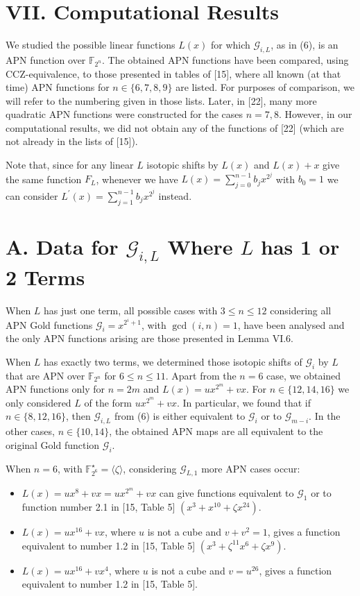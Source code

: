 \documentclass[10pt]{article}
\begin{document}
\section*{VII. Computational Results}
We studied the possible linear functions $L(x)$ for which $\mathcal{G}_{i, L}$, as in (6), is an APN function over $\mathbb{F}_{2^{n}}$. The obtained APN functions have been compared, using CCZ-equivalence, to those presented in tables of [15], where all known (at that time) APN functions for $n \in\{6,7,8,9\}$ are listed. For purposes of comparison, we will refer to the numbering given in those lists. Later, in [22], many more quadratic APN functions were constructed for the cases $n=7,8$. However, in our computational results, we did not obtain any of the functions of [22] (which are not already in the lists of [15]).

Note that, since for any linear $L$ isotopic shifts by $L(x)$ and $L(x)+x$ give the same function $F_{L}$, whenever we have $L(x)=\sum_{j=0}^{n-1} b_{j} x^{2^{j}}$ with $b_{0}=1$ we can consider $L^{\prime}(x)= \sum_{j=1}^{n-1} b_{j} x^{2^{j}}$ instead.

\section*{A. Data for $\mathcal{G}_{i, L}$ Where $L$ has 1 or 2 Terms}
When $L$ has just one term, all possible cases with $3 \leq n \leq 12$ considering all APN Gold functions $\mathcal{G}_{i}=x^{2^{i}+1}$, with $\operatorname{gcd}(i, n)=1$, have been analysed and the only APN functions arising are those presented in Lemma VI.6.

When $L$ has exactly two terms, we determined those isotopic shifts of $\mathcal{G}_{i}$ by $L$ that are APN over $\mathbb{F}_{2^{n}}$ for $6 \leq n \leq 11$. Apart from the $n=6$ case, we obtained APN functions only for $n=2 m$ and $L(x)=u x^{2^{m}}+v x$. For $n \in\{12,14,16\}$ we only considered $L$ of the form $u x^{2^{m}}+v x$. In particular, we found that if $n \in\{8,12,16\}$, then $\mathcal{G}_{i, L}$ from (6) is either equivalent to $\mathcal{G}_{i}$ or to $\mathcal{G}_{m-i}$. In the other cases, $n \in\{10,14\}$, the obtained APN maps are all equivalent to the original Gold function $\mathcal{G}_{i}$.

When $n=6$, with $\mathbb{F}_{2^{6}}^{\star}=\langle\zeta\rangle$, considering $\mathcal{G}_{L, 1}$ more APN cases occur:

\begin{itemize}
  \item $L(x)=u x^{8}+v x=u x^{2^{m}}+v x$ can give functions equivalent to $\mathcal{G}_{1}$ or to function number 2.1 in [15, Table 5] $\left(x^{3}+x^{10}+\zeta x^{24}\right)$.
  \item $L(x)=u x^{16}+v x$, where $u$ is not a cube and $v+v^{2}=1$, gives a function equivalent to number 1.2 in [15, Table 5] $\left(x^{3}+\zeta^{11} x^{6}+\zeta x^{9}\right)$.
  \item $L(x)=u x^{16}+v x^{4}$, where $u$ is not a cube and $v=u^{26}$, gives a function equivalent to number 1.2 in [15, Table 5].
\end{itemize}
\end{document}
